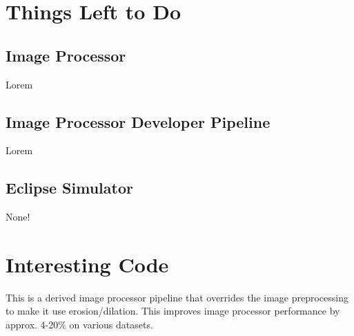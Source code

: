 \documentclass[10pt, onecolumn, draftclsnofoot, letterpaper, compsoc]{IEEEtran}
\begin{document}
\section{Things Left to Do}

\subsection{Image Processor}

Lorem \\

\subsection{Image Processor Developer Pipeline}

Lorem \\

\subsection{Eclipse Simulator}

None! \\


\newpage
\section{Interesting Code}

This is a derived image processor pipeline that overrides the image preprocessing
to make it use erosion/dilation. This improves image processor performance by approx. 4-20\%
on various datasets. \\
\end{document}
